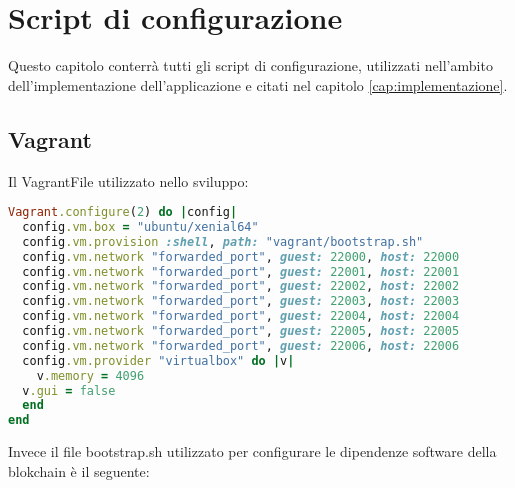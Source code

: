%
%
\chapter{Script di configurazione}
%
\label{cap:codici}
%
Questo capitolo conterrà tutti gli script di configurazione, utilizzati nell'ambito dell'implementazione dell'applicazione e citati nel capitolo \autoref{cap:implementazione}.
%
\section{Vagrant}
%
\label{cap:vagrantConfig}
%
Il VagrantFile utilizzato nello sviluppo:\newline
\begin{center}
	\begin{lstlisting}[language=ruby,caption={VagrantFile del progetto},captionpos=b,frame=lines,basicstyle=\linespread{0.9}\small]
Vagrant.configure(2) do |config|
  config.vm.box = "ubuntu/xenial64"
  config.vm.provision :shell, path: "vagrant/bootstrap.sh"
  config.vm.network "forwarded_port", guest: 22000, host: 22000
  config.vm.network "forwarded_port", guest: 22001, host: 22001
  config.vm.network "forwarded_port", guest: 22002, host: 22002
  config.vm.network "forwarded_port", guest: 22003, host: 22003
  config.vm.network "forwarded_port", guest: 22004, host: 22004
  config.vm.network "forwarded_port", guest: 22005, host: 22005
  config.vm.network "forwarded_port", guest: 22006, host: 22006
  config.vm.provider "virtualbox" do |v|
    v.memory = 4096
  v.gui = false
  end
end
	\end{lstlisting}
\end{center}
%
Invece il file bootstrap.sh utilizzato per configurare le dipendenze software della blokchain è il seguente:
\newline

